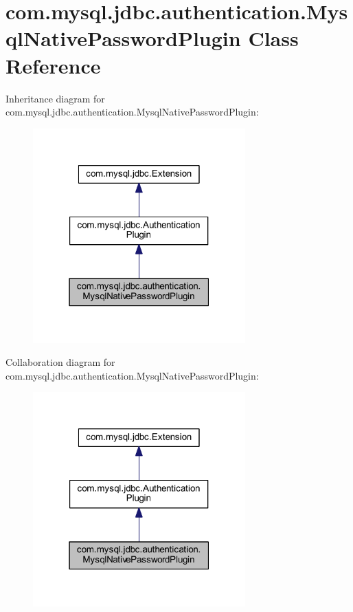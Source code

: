 \hypertarget{classcom_1_1mysql_1_1jdbc_1_1authentication_1_1_mysql_native_password_plugin}{}\section{com.\+mysql.\+jdbc.\+authentication.\+Mysql\+Native\+Password\+Plugin Class Reference}
\label{classcom_1_1mysql_1_1jdbc_1_1authentication_1_1_mysql_native_password_plugin}


Inheritance diagram for com.\+mysql.\+jdbc.\+authentication.\+Mysql\+Native\+Password\+Plugin\+:
\nopagebreak
\begin{figure}[H]
\begin{center}
\leavevmode
\includegraphics[width=232pt]{classcom_1_1mysql_1_1jdbc_1_1authentication_1_1_mysql_native_password_plugin__inherit__graph}
\end{center}
\end{figure}


Collaboration diagram for com.\+mysql.\+jdbc.\+authentication.\+Mysql\+Native\+Password\+Plugin\+:
\nopagebreak
\begin{figure}[H]
\begin{center}
\leavevmode
\includegraphics[width=232pt]{classcom_1_1mysql_1_1jdbc_1_1authentication_1_1_mysql_native_password_plugin__coll__graph}
\end{center}
\end{figure}
